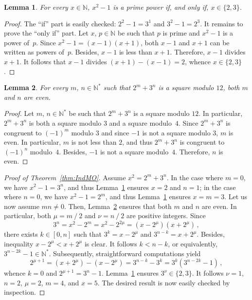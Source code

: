 \documentclass[12pt]{article}
\newcommand{\bZ}{\mathbb{Z}}
\newcommand{\bN}{\mathbb{N}} %
\newcommand{\bNast}{\bN^*}
\newcommand{\binover}{\mathbin{/}}
\newtheorem{lemma}{Lemma}
\theoremstyle{definition}
\begin{document}
     \begin{lemma} \label{lem:x2=q+1}
       For every $x \in \bN$, $x^2 - 1$ is a prime power if, and only if, $x \in \{ 2, 3 \}$. 
     \end{lemma}

     \begin{proof}
       The ``if'' part is easily checked: $2^2 - 1 = 3^1$ and $3^2 - 1 = 2^3$. 
       It remains to prove the ``only if'' part.
       Let $x$, $p \in \bN$ be such that $p$ is prime and $x^2 - 1$ is a power of~$p$.
       Since  $x^2 - 1 = (x - 1)(x + 1)$, 
       both $x - 1$ and $x + 1$ can be written as powers of~$p$.
       Besides, $x - 1$ is less than $x + 1$.
       Therefore, $x - 1$ divides $x + 1$.
       It follows that $x - 1$ divides $(x + 1) - (x - 1) = 2$,
       whence $x \in \{ 2, 3 \}$.
    \end{proof} 
    

   
   \begin{lemma} \label{lem:2m+3n-square-mod-12}
     For every $m$, $n \in \bNast$ such that $2^m + 3^n$ is a square modulo $12$,
     both $m$ and $n$ are even.
   \end{lemma}

   \begin{proof}
     Let $m$, $n \in \bNast$ be such that $2^m + 3^n$ is a square modulo $12$.
     In particular, $2^m + 3^n$ is both a square modulo $3$ and a square modulo~$4$.
     Since $2^m + 3^n$ is congruent to ${(- 1)}^m$ modulo $3$ and since $- 1$ is not a square modulo $3$,
     $m$ is even.
     In particular, $m$ is not less than $2$, and thus $2^m + 3^n$ is congruent to ${(- 1)}^n$ modulo~$4$.
     Besides, $- 1$ is not a square modulo~$4$.
     Therefore, $n$ is even.
   \end{proof}


   
   \begin{proof}[Proof of Theorem~\ref{thm:IndMO}]
     Assume $x^2 = 2^m + 3^n$.
     In the case where $m = 0$,
     we have $x^2 - 1 = 3^n$,
     and thus Lemma~\ref{lem:x2=q+1} ensures $x = 2$ and $n = 1$;
     in the case where $n = 0$,
     we have $x^2 - 1 = 2^m$,
     and thus Lemma~\ref{lem:x2=q+1} ensures $x = m = 3$.
     Let us now assume $mn \ne 0$.
     Then, Lemma~\ref{lem:2m+3n-square-mod-12} ensures that both $m$ and $n$ are even.
     In particular, both $\mu = m \binover 2$ and $\nu = n \binover 2$ are positive integers.
     Since 
     $$
     3^n = x^2 - 2^m = x^2 - 2^{2\mu} = (x - 2^\mu)(x + 2^\mu) \,, 
     $$
     there exists $k \in [0, n]$ such that $3^k = x - 2^\mu$ and $3^{n - k} = x + 2^\mu$.
     Besides, inequality $x - 2^\mu < x + 2^\mu$ is clear. 
     It follows $k < n - k$, or equivalently, $3^{n - 2 k} - 1 \in \bNast$.
     Subsequently, straightforward computations yield
     $$
     2^{\mu + 1} = (x + 2^\mu) - (x - 2^\mu) = 3^{n - k} - 3^k = 3^k \left( 3^{n - 2k} - 1 \right) \,,
     $$
     whence $k = 0$ and $2^{\mu + 1} = 3^n - 1$.
     Lemma~\ref{lem:x2=q+1} ensures $3^\nu \in \{ 2, 3 \}$.
     It follows $\nu = 1$, $n = 2$, $\mu = 2$, $m = 4$, and $x = 5$.
     The desired result is now easily checked by inspection. 
  \end{proof}
\end{document}
